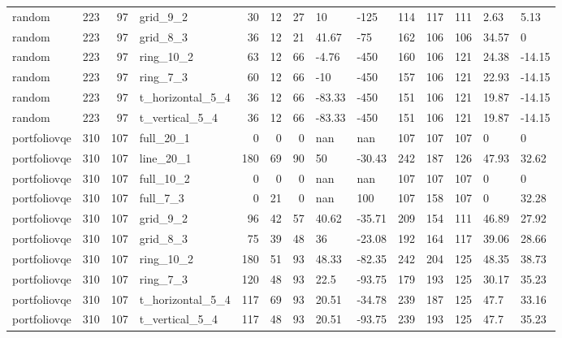 \begin{longtable}{lrrlrrrllrrrll}
random & 223 & 97 & grid\_9\_2 & 30 & 12 & 27 & 10 & -125 & 114 & 117 & 111 & 2.63 & 5.13 \\
random & 223 & 97 & grid\_8\_3 & 36 & 12 & 21 & 41.67 & -75 & 162 & 106 & 106 & 34.57 & 0 \\
random & 223 & 97 & ring\_10\_2 & 63 & 12 & 66 & -4.76 & -450 & 160 & 106 & 121 & 24.38 & -14.15 \\
random & 223 & 97 & ring\_7\_3 & 60 & 12 & 66 & -10 & -450 & 157 & 106 & 121 & 22.93 & -14.15 \\
random & 223 & 97 & t\_horizontal\_5\_4 & 36 & 12 & 66 & -83.33 & -450 & 151 & 106 & 121 & 19.87 & -14.15 \\
random & 223 & 97 & t\_vertical\_5\_4 & 36 & 12 & 66 & -83.33 & -450 & 151 & 106 & 121 & 19.87 & -14.15 \\
portfoliovqe & 310 & 107 & full\_20\_1 & 0 & 0 & 0 & nan & nan & 107 & 107 & 107 & 0 & 0 \\
portfoliovqe & 310 & 107 & line\_20\_1 & 180 & 69 & 90 & 50 & -30.43 & 242 & 187 & 126 & 47.93 & 32.62 \\
portfoliovqe & 310 & 107 & full\_10\_2 & 0 & 0 & 0 & nan & nan & 107 & 107 & 107 & 0 & 0 \\
portfoliovqe & 310 & 107 & full\_7\_3 & 0 & 21 & 0 & nan & 100 & 107 & 158 & 107 & 0 & 32.28 \\
portfoliovqe & 310 & 107 & grid\_9\_2 & 96 & 42 & 57 & 40.62 & -35.71 & 209 & 154 & 111 & 46.89 & 27.92 \\
portfoliovqe & 310 & 107 & grid\_8\_3 & 75 & 39 & 48 & 36 & -23.08 & 192 & 164 & 117 & 39.06 & 28.66 \\
portfoliovqe & 310 & 107 & ring\_10\_2 & 180 & 51 & 93 & 48.33 & -82.35 & 242 & 204 & 125 & 48.35 & 38.73 \\
portfoliovqe & 310 & 107 & ring\_7\_3 & 120 & 48 & 93 & 22.5 & -93.75 & 179 & 193 & 125 & 30.17 & 35.23 \\
portfoliovqe & 310 & 107 & t\_horizontal\_5\_4 & 117 & 69 & 93 & 20.51 & -34.78 & 239 & 187 & 125 & 47.7 & 33.16 \\
portfoliovqe & 310 & 107 & t\_vertical\_5\_4 & 117 & 48 & 93 & 20.51 & -93.75 & 239 & 193 & 125 & 47.7 & 35.23 \\
\end{longtable}
